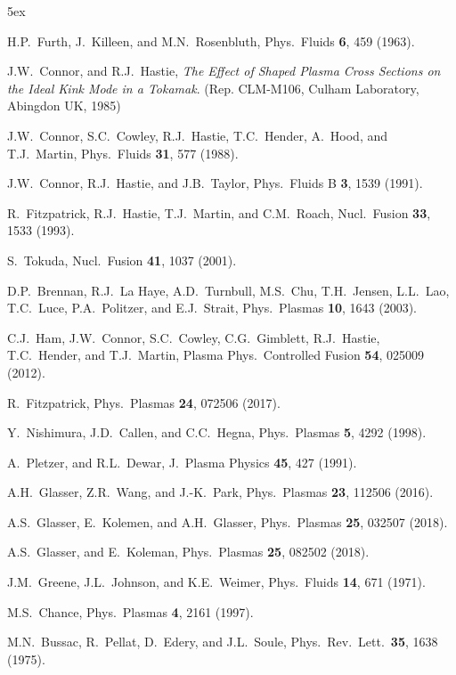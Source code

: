 \documentclass[12pt,prb,aps]{revtex4-1}
\begin{document}
\begin{thebibliography}{99}\baselineskip 5ex

 H.P.~Furth,  J.~Killeen, and M.N.~Rosenbluth,  Phys.\ Fluids {\bf 6}, 459 (1963).

 J.W.~Connor, and R.J.~Hastie, {\em The Effect of Shaped Plasma Cross Sections on the Ideal Kink Mode in a Tokamak}. (Rep. CLM-M106, Culham Laboratory, Abingdon UK, 1985)

 J.W.~Connor,  S.C.~Cowley, R.J.~Hastie,  T.C.~Hender,  A.~Hood, and T.J.~Martin, 
Phys.\ Fluids {\bf 31}, 577 (1988).

 J.W.~Connor, R.J.~Hastie, and J.B.~Taylor, Phys.\ Fluids B {\bf 3}, 1539 (1991).

 R.~Fitzpatrick, R.J.~Hastie, T.J.~Martin, and C.M.~Roach, Nucl.\ Fusion {\bf 33}, 1533 (1993).

 S.~Tokuda, Nucl.\ Fusion {\bf 41}, 1037 (2001).

 D.P.~Brennan, R.J.~La Haye, A.D.~Turnbull, M.S.~Chu, T.H.~Jensen, L.L.~Lao, T.C.~Luce, P.A.~Politzer, and E.J.~Strait, Phys.\ Plasmas {\bf 10}, 1643 (2003).

 C.J.~Ham, J.W.~Connor, S.C.~Cowley, C.G.~Gimblett, R.J.~Hastie, T.C.~Hender, and T.J.~Martin, Plasma Phys.\ Controlled Fusion {\bf 54}, 025009 (2012). 

 R.~Fitzpatrick, Phys.\ Plasmas {\bf 24}, 072506 (2017). 

 Y.~Nishimura, J.D.~Callen, and C.C.~Hegna, Phys.\ Plasmas {\bf 5}, 4292 (1998).

 A.~Pletzer, and R.L.~Dewar, J.\ Plasma Physics {\bf 45}, 427 (1991).

 A.H.~Glasser, Z.R.~Wang, and J.-K.~Park, Phys.\ Plasmas {\bf 23}, 112506 (2016).

 A.S.~Glasser, E.~Kolemen, and A.H.~Glasser, Phys.\ Plasmas {\bf 25}, 032507 (2018).

 A.S.~Glasser, and E.~Koleman, Phys.\ Plasmas {\bf 25}, 082502 (2018). 

 J.M.~Greene, J.L.~Johnson, and K.E.~Weimer,  Phys.\  Fluids  {\bf 14}, 671 (1971).

 M.S.~Chance, Phys.\ Plasmas {\bf 4}, 2161 (1997).

 M.N.~Bussac, R.~Pellat, D.~Edery, and J.L.~Soule, Phys.\ Rev.\ Lett.\ {\bf 35}, 1638 (1975).


\end{thebibliography}
\end{document}
